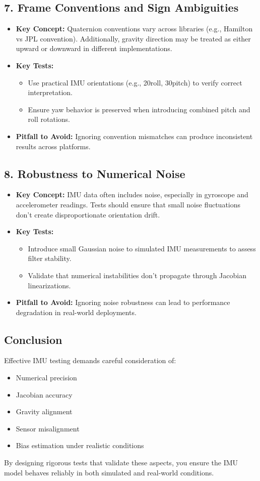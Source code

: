 \documentclass{article}
\begin{document}
\subsection*{7. Frame Conventions and Sign Ambiguities}
\begin{itemize}
	\item \textbf{Key Concept:} Quaternion conventions vary across libraries (e.g., Hamilton vs JPL convention). Additionally, gravity direction may be treated as either upward or downward in different implementations.
	\item \textbf{Key Tests:}
	\begin{itemize}
		\item Use practical IMU orientations (e.g., 20\textdegree roll, 30\textdegree pitch) to verify correct interpretation.
		\item Ensure yaw behavior is preserved when introducing combined pitch and roll rotations.
	\end{itemize}
	\item \textbf{Pitfall to Avoid:} Ignoring convention mismatches can produce inconsistent results across platforms.
\end{itemize}

\subsection*{8. Robustness to Numerical Noise}
\begin{itemize}
	\item \textbf{Key Concept:} IMU data often includes noise, especially in gyroscope and accelerometer readings. Tests should ensure that small noise fluctuations don't create disproportionate orientation drift.
	\item \textbf{Key Tests:}
	\begin{itemize}
		\item Introduce small Gaussian noise to simulated IMU measurements to assess filter stability.
		\item Validate that numerical instabilities don't propagate through Jacobian linearizations.
	\end{itemize}
	\item \textbf{Pitfall to Avoid:} Ignoring noise robustness can lead to performance degradation in real-world deployments.
\end{itemize}

\subsection*{Conclusion}
Effective IMU testing demands careful consideration of:
\begin{itemize}
	\item Numerical precision
	\item Jacobian accuracy
	\item Gravity alignment
	\item Sensor misalignment
	\item Bias estimation under realistic conditions
\end{itemize}
By designing rigorous tests that validate these aspects, you ensure the IMU model behaves reliably in both simulated and real-world conditions.
\end{document}

